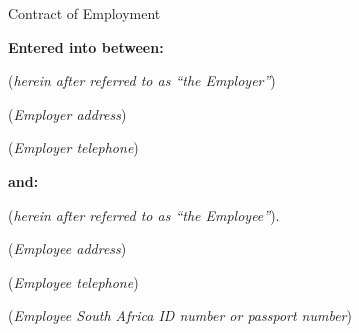 \documentclass[a4paper,11pt]{article}
\begin{document}

\raggedright

\begin{center}
  {\Huge \textsf{Contract of Employment}}

  \vspace{2cm}

  \textbf{Entered into between:}

  \vspace{0.5cm}


  (\textit{herein after referred to as ``the Employer''})

  \vspace{0.5cm}



  (\textit{Employer address})

  \vspace{0.5cm}


  (\textit{Employer telephone})

  \vspace{0.5cm}

  \textbf{and:}

  \vspace{0.5cm}


  (\textit{herein after referred to as ``the Employee''}).

  \vspace{0.5cm}



  (\textit{Employee address})

  \vspace{0.5cm}


  (\textit{Employee telephone})

  \vspace{0.5cm}


  (\textit{Employee South Africa ID number or passport number})

  \vspace{0.5cm}

\end{center}
\end{document}
